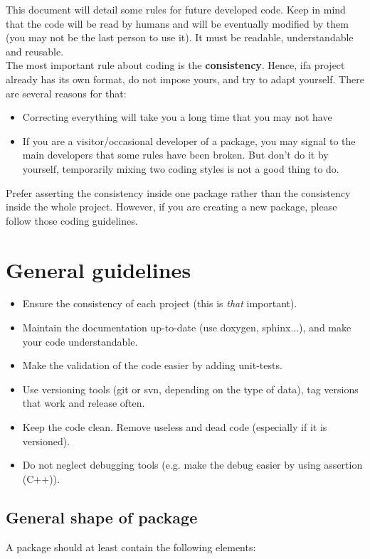 This document will detail some rules for future developed code.
Keep in mind that the code will be read by humans and will be eventually modified by them (you may not be the last person to use it). 
It must be readable, understandable and reusable.\\

The most important rule about coding is the \textbf{consistency}.
Hence, ifa project already has its own format, do not impose yours, and try to adapt yourself.
There are several reasons for that:
\begin{itemize}
\item Correcting everything will take you a long time that you may not have
\item If you are a visitor/occasional developer of a package, you may signal to the main developers that some rules have been broken. But don't do it by yourself, temporarily mixing two coding styles is not a good thing to do.
\end{itemize}
Prefer asserting the consistency inside one package rather than the consistency inside the whole project.
However, if you are creating a new package, please follow those coding guidelines.

\chapter{General guidelines}
\label{section:general-guidelines}
\begin{itemize}
\item Ensure the consistency of each project (this is \textit{that} important).
\item Maintain the documentation up-to-date (use doxygen, sphinx...), and make your code understandable.
\item Make the validation of the code easier by adding unit-tests.
\item Use versioning tools (git or svn, depending on the type of data), tag versions that work and release often.
\item Keep the code clean. Remove useless and dead code (especially if it is versioned).
\item Do not neglect debugging tools (e.g. make the debug easier by using assertion (C++)).
\end{itemize}

\section{General shape of package}
A package should at least contain the following elements:
